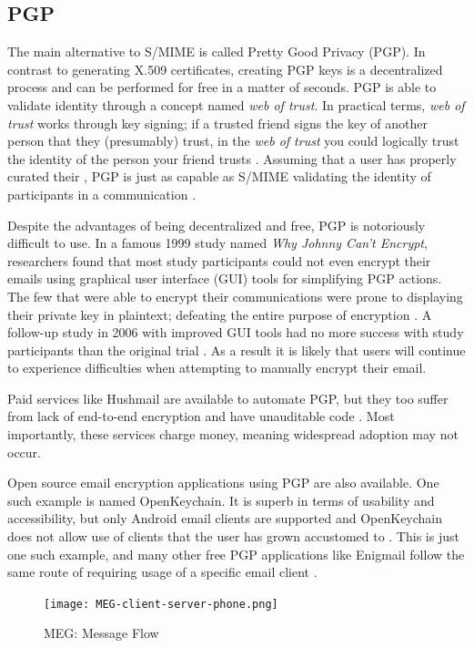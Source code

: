 \documentclass{sig-alternate-05-2015}
\begin{document}
\subsection{PGP}
\par The main alternative to S/MIME is called Pretty Good Privacy (PGP). In contrast to generating X.509 certificates, creating PGP keys is a decentralized process and can be performed for free in a matter of seconds. PGP is able to validate identity through a concept named \textit{web of trust}. In practical terms, \textit{web of trust} works through key signing; if a trusted friend signs the key of another person that they (presumably) trust, in the \textit{web of trust} you could logically trust the identity of the person your friend trusts \cite{zimmermann1995official}. Assuming that a user has properly curated their , PGP is just as capable as S/MIME validating the identity of participants in a communication \cite{furnell2013usable}.
\par Despite the advantages of being decentralized and free, PGP is notoriously difficult to use. In a famous 1999 study named \textit{Why Johnny Can't Encrypt}, researchers found that most study participants could not even encrypt their emails using graphical user interface (GUI) tools for simplifying PGP actions. The few that were able to encrypt their communications were prone to displaying their private key in plaintext; defeating the entire purpose of encryption \cite{whitten1999johnny}. A follow-up study in 2006 with improved GUI tools had no more success with study participants than the original trial \cite{sheng2006johnny}. As a result it is likely that users will continue to experience difficulties when attempting to manually encrypt their email.
\par Paid services like Hushmail are available to automate PGP, but they too suffer from lack of end-to-end encryption and have unauditable code \cite{ciphermail-gateway,hushmail,eff-scorecard}. Most importantly, these services charge money, meaning widespread adoption may not occur.
\par Open source email encryption applications using PGP are also available. One such example is named OpenKeychain. It is superb in terms of usability and accessibility, but only Android email clients are supported and OpenKeychain does not allow use of clients that the user has grown accustomed to \cite{openkeychain}. This is just one such example, and many other free PGP applications like Enigmail follow the same route of requiring usage of a specific email client \cite{enigmail-handbook}.
\begin{figure}[h]
    \texttt{[image: MEG-client-server-phone.png]}
    \centering
    \caption{MEG: Message Flow}
    \label{fig:Flow}
\end{figure}
\end{document}
